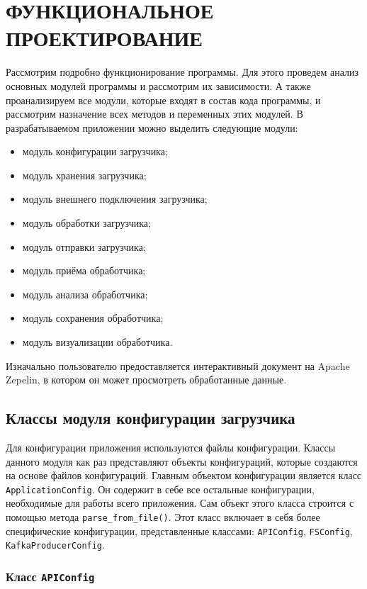 \section{ФУНКЦИОНАЛЬНОЕ ПРОЕКТИРОВАНИЕ}
\label{sec:func}

Рассмотрим подробно функционирование программы.
Для этого проведем анализ основных модулей программы и рассмотрим их зависимости.
А также проанализируем все модули, которые входят в состав кода программы, и рассмотрим назначение всех методов и переменных этих модулей.
В разрабатываемом приложении можно выделить следующие модули:
\begin{itemize}
    \item модуль конфигурации загрузчика;
    \item модуль хранения загрузчика;
    \item модуль внешнего подключения загрузчика;
    \item модуль обработки загрузчика;
    \item модуль отправки загрузчика;
    \item модуль приёма обработчика;
    \item модуль анализа обработчика;
    \item модуль сохранения обработчика;
    \item модуль визуализации обработчика.
\end{itemize}

Изначально пользователю предоставляется интерактивный документ на Apache Zepelin, в котором он может просмотреть обработанные данные.

\subsection{Классы модуля конфигурации загрузчика}
Для конфигурации приложения используются файлы конфигурации.
Классы данного модуля как раз представляют объекты конфигураций, которые создаются на основе файлов конфигураций.
Главным объектом конфигурации является класс \texttt{ApplicationConfig}.
Он содержит в себе все остальные конфигурации, необходимые для работы всего приложения.
Сам объект этого класса строится с помощью метода \texttt{parse\_from\_file()}.
Этот класс включает в себя более специфические конфигурации, представленные классами: \texttt{APIConfig}, \texttt{FSConfig}, \texttt{KafkaProducerConfig}.

\subsubsection{Класс \texttt{APIConfig}}


